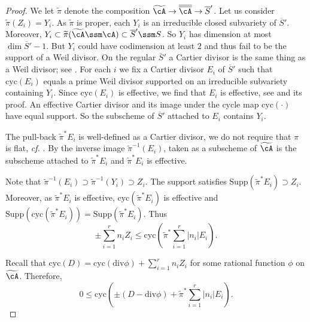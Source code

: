 \begin{proof}
We let $\widetilde\pi$ denote the composition
$\widetilde\cA\rightarrow \overline{\overline\cA}\rightarrow \overline{S}'$.
Let us consider $\widetilde\pi(Z_i) = Y_i$. As $\widetilde\pi$ is proper, each $Y_i$ is
an irreducible closed subvariety of $\overline S'$. Moreover, $Y_i
\subset \widetilde\pi(\widetilde{\cA}\ssm \cA) \subset \overline S'\ssm S$. So $Y_i$ has
dimension at most $\dim \overline S' - 1$. But $Y_i$ could have
codimension at least $2$ and thus fail to be the support of a Weil divisor.
On the regular $\overline S'$ a
Cartier divisor is the same thing as a Weil divisor;
see \cite[Theorem~11.38(2)]{GoertzWedhorn}.
For each $i$ we fix a Cartier divisor  $E_i$ of $\overline S'$
such that   $\mathrm{cyc}(E_i)$ equals a prime Weil divisor supported on an irreducible
subvariety containing $Y_i$.
 Since $\mathrm{cyc}(E_i)$ is effective, we find that $E_i$ is effective, see \cite[Theorem~11.38(1)]{GoertzWedhorn}
 and its proof.
An effective Cartier divisor and its image under the cycle map
$\mathrm{cyc}(\cdot)$ have equal support. So the subscheme of $\overline S'$ attached to  $E_i$
contains $Y_i$.

The pull-back $\widetilde\pi^*E_i$ is well-defined as a Cartier
divisor, we do not require that $\pi$ is flat, \textit{cf.}
\cite[Proposition~11.48(b)]{GoertzWedhorn}.
By \cite[Corollary~11.49]{GoertzWedhorn} the inverse image
$\widetilde\pi^{-1}(E_i)$, taken as  a subscheme of $\widetilde{\cA}$
is the subscheme attached to  $\widetilde\pi^*E_i$ and $\widetilde\pi^*E_i$ is
effective.

Note that $\widetilde\pi^{-1}(E_i)\supset \widetilde\pi^{-1}(Y_i)\supset Z_i$.
The support satisfies $\mathrm{Supp}(\widetilde\pi^* E_i)\supset Z_i$.
Moreover, as $\widetilde\pi^*E_i$ is effective,  $\mathrm{cyc}(\widetilde\pi^* E_i)$ is effective and
 $\mathrm{Supp} (\mathrm{cyc}(\widetilde\pi^* E_i)) =
\mathrm{Supp}(\widetilde\pi^*E_i)$.
Thus
\begin{equation*}
\pm   \sum_{i=1}^r n_i Z_i \le \mathrm{cyc}\left(\widetilde\pi^*\sum_{i=1}^r |n_i|
  E_i\right).
\end{equation*}

Recall that $\mathrm{cyc}(D) = \mathrm{cyc}(\mathrm{div}\phi) +
\sum_{i=1}^r n_i Z_i$ for some rational function $\phi$ on
$\widetilde{\cA}$. Therefore,
\begin{equation*}
0\le   \mathrm{cyc}\left(\pm (D-\mathrm{div}\phi) + \widetilde\pi^*\sum_{i=1}^r |n_i| E_i\right).
\end{equation*}


\end{proof}

